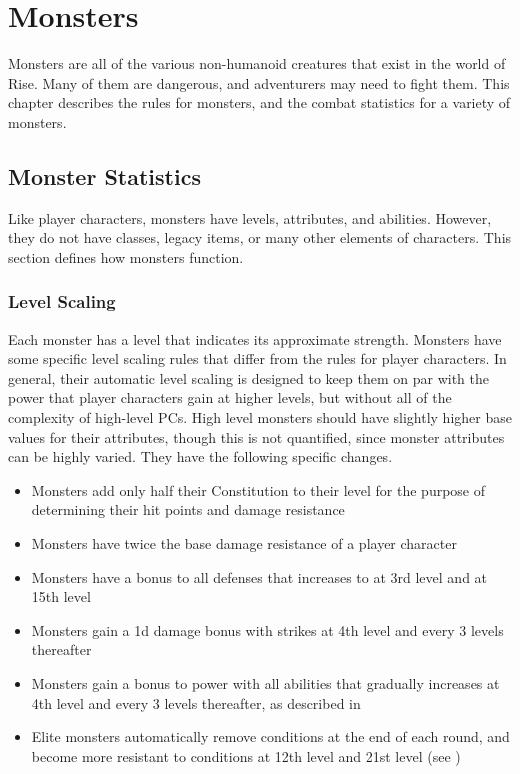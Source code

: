 \chapter{Monsters}

Monsters are all of the various non-humanoid creatures that exist in the world of Rise.
Many of them are dangerous, and adventurers may need to fight them.
This chapter describes the rules for monsters, and the combat statistics for a variety of monsters.

\section{Monster Statistics}
    Like player characters, monsters have levels, attributes, and abilities.
    However, they do not have classes, legacy items, or many other elements of characters.
    This section defines how monsters function.

    \subsection{Level Scaling}
        Each monster has a level that indicates its approximate strength.
        Monsters have some specific level scaling rules that differ from the rules for player characters.
        In general, their automatic level scaling is designed to keep them on par with the power that player characters gain at higher levels, but without all of the complexity of high-level PCs.
        High level monsters should have slightly higher base values for their attributes, though this is not quantified, since monster attributes can be highly varied.
        They have the following specific changes.
        \begin{itemize}
            \item Monsters add only half their Constitution to their level for the purpose of determining their hit points and damage resistance
            \item Monsters have twice the base damage resistance of a player character
            \item Monsters have a  bonus to all defenses that increases to  at 3rd level and  at 15th level
            \item Monsters gain a \plus1d damage bonus with strikes at 4th level and every 3 levels thereafter
            \item Monsters gain a  bonus to power with all abilities that gradually increases at 4th level and every 3 levels thereafter, as described in 
            \item Elite monsters automatically remove conditions at the end of each round, and become more resistant to conditions at 12th level and 21st level (see )
        \end{itemize}

